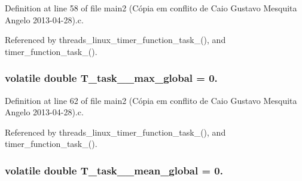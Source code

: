 Definition at line 58 of file main2 (\-Cópia em conflito de Caio Gustavo Mesquita Angelo 2013-\/04-\/28).\-c.



Referenced by threads\-\_\-linux\-\_\-timer\-\_\-function\-\_\-task\-\_(), and timer\-\_\-function\-\_\-task\-\_().

\hypertarget{main2_01_07C_xC3_xB3pia_01em_01conflito_01de_01Caio_01Gustavo_01Mesquita_01Angelo_012013-04-28_08_8c_a1cd82006c46f46176730e876d272cc14}{
\subsubsection[{T\-\_\-task\-\_\-2\-\_\-max\-\_\-global}]{\setlength{\rightskip}{0pt plus 5cm}volatile double T\-\_\-task\-\_\-\_\-max\-\_\-global = 0.}}\label{main2_01_07C_xC3_xB3pia_01em_01conflito_01de_01Caio_01Gustavo_01Mesquita_01Angelo_012013-04-28_08_8c_a1cd82006c46f46176730e876d272cc14}


Definition at line 62 of file main2 (\-Cópia em conflito de Caio Gustavo Mesquita Angelo 2013-\/04-\/28).\-c.



Referenced by threads\-\_\-linux\-\_\-timer\-\_\-function\-\_\-task\-\_(), and timer\-\_\-function\-\_\-task\-\_().

\hypertarget{main2_01_07C_xC3_xB3pia_01em_01conflito_01de_01Caio_01Gustavo_01Mesquita_01Angelo_012013-04-28_08_8c_af4e19d5a9b24aa56c8ebff6ad1aa2b95}{
\subsubsection[{T\-\_\-task\-\_\-2\-\_\-mean\-\_\-global}]{\setlength{\rightskip}{0pt plus 5cm}volatile double T\-\_\-task\-\_\-\_\-mean\-\_\-global = 0.}}\label{main2_01_07C_xC3_xB3pia_01em_01conflito_01de_01Caio_01Gustavo_01Mesquita_01Angelo_012013-04-28_08_8c_af4e19d5a9b24aa56c8ebff6ad1aa2b95}


